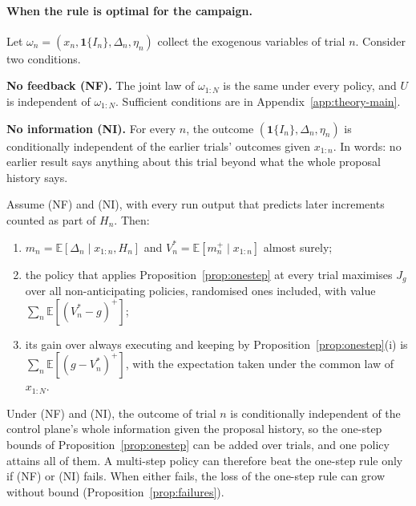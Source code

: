 \paragraph{When the rule is optimal for the campaign.}
Let $\omega_n=(x_n,\mathbf{1}\{I_n\},\Delta_n,\eta_n)$ collect the exogenous variables of trial $n$. Consider two conditions.

\textbf{No feedback (NF).} The joint law of $\omega_{1:N}$ is the same under every policy, and $U$ is independent of $\omega_{1:N}$. Sufficient conditions are in Appendix~\ref{app:theory-main}.

\textbf{No information (NI).} For every $n$, the outcome $(\mathbf{1}\{I_n\},\Delta_n,\eta_n)$ is conditionally independent of the earlier trials' outcomes given $x_{1:n}$. In words: no earlier result says anything about this trial beyond what the whole proposal history says.

\begin{theorem}\label{thm:reduction}
Assume (NF) and (NI), with every run output that predicts later increments counted as part of $H_n$. Then:
\begin{enumerate}
\item[(1)] $m_n=\mathbb{E}[\Delta_n\mid x_{1:n},H_n]$ and $V^*_n=\mathbb{E}[m_n^+\mid x_{1:n}]$ almost surely;
\item[(2)] the policy that applies Proposition~\ref{prop:onestep} at every trial maximises $J_g$ over all non-anticipating policies, randomised ones included, with value $\sum_n\mathbb{E}[(V^*_n-g)^+]$;
\item[(3)] its gain over always executing and keeping by Proposition~\ref{prop:onestep}(i) is $\sum_n\mathbb{E}[(g-V^*_n)^+]$, with the expectation taken under the common law of $x_{1:N}$.
\end{enumerate}
\end{theorem}

Under (NF) and (NI), the outcome of trial $n$ is conditionally independent of the control plane's whole information given the proposal history, so the one-step bounds of Proposition~\ref{prop:onestep} can be added over trials, and one policy attains all of them. A multi-step policy can therefore beat the one-step rule only if (NF) or (NI) fails. When either fails, the loss of the one-step rule can grow without bound (Proposition~\ref{prop:failures}).

